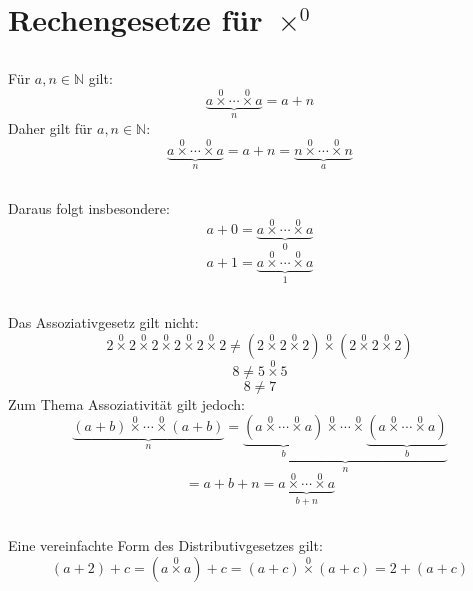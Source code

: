 \documentclass{article}
\begin{document}
\section{Rechengesetze f\"ur $\operatorname*{\times}^0$\newline}

\subsection{}
F\"ur $a, n \in \mathbb{N}$ gilt:
\[ \underbrace{a \operatorname*{\times}^0 \dotsb \operatorname*{\times}^0 a}_n = a+n \]
Daher gilt f\"ur $a, n \in \mathbb{N}$:
\[ \underbrace{a \operatorname*{\times}^0 \dotsb \operatorname*{\times}^0 a}_n =
   a+n = \underbrace{n \operatorname*{\times}^0 \dotsb \operatorname*{\times}^0 n}_a \]
\subsection{}
Daraus folgt insbesondere:
\[ a + 0 = \underbrace{a\operatorname*{\times}^0 \dotsb \operatorname*{\times}^0 a}_0 \]
\[ a + 1 = \underbrace{a\operatorname*{\times}^0 \dotsb \operatorname*{\times}^0 a}_1 \]
\subsection{}
	Das Assoziativgesetz gilt nicht:
\[ 2 \operatorname*{\times}^0 2 \operatorname*{\times}^0 2 \operatorname*{\times}^0 2 \operatorname*{\times}^0 2 \operatorname*{\times}^0 2 \neq
   \left(2 \operatorname*{\times}^0 2 \operatorname*{\times}^0 2\right) \operatorname*{\times}^0 \left(2 \operatorname*{\times}^0 2 \operatorname*{\times}^0 2\right) \]
\[ 8 \neq 5 \operatorname*{\times}^0 5 \]
\[ 8 \neq 7 \]
	Zum Thema Assoziativit\"at gilt jedoch:
\[  \underbrace{\left(a+b\right)\operatorname*{\times}^0 \dotsb \operatorname*{\times}^0 \left(a+b\right)}_n =
    \underbrace{\underbrace{\left(a\operatorname*{\times}^0 \dotsb\operatorname*{\times}^0 a\right)}_b \operatorname*{\times}^0 \dotsb \operatorname*{\times}^0\underbrace{\left(a\operatorname*{\times}^0 \dotsb\operatorname*{\times}^0 a\right)}_b }_n \]
\[ = a + b + n = \underbrace{a\operatorname*{\times}^0 \dotsb \operatorname*{\times}^0 a}_{b+n} \]
\subsection{}
	Eine vereinfachte Form des Distributivgesetzes gilt:
\[ \left(a + 2\right) + c = \left(a\operatorname*{\times}^0a\right) + c = \left(a+c\right)\operatorname*{\times}^0\left(a+c\right) = 2 + \left(a + c\right) \]
\end{document}
